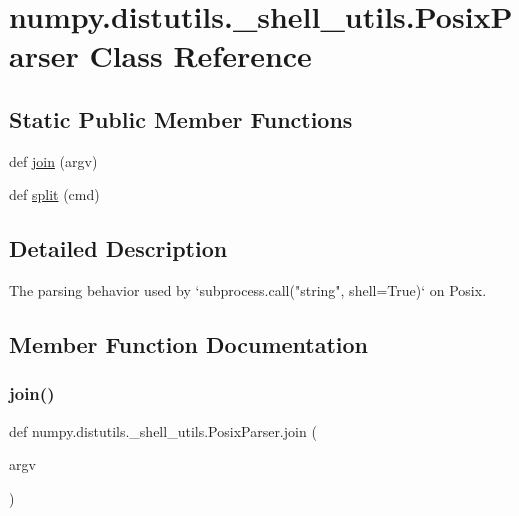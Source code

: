 \hypertarget{classnumpy_1_1distutils_1_1__shell__utils_1_1PosixParser}{}\section{numpy.\+distutils.\+\_\+shell\+\_\+utils.\+Posix\+Parser Class Reference}
\label{classnumpy_1_1distutils_1_1__shell__utils_1_1PosixParser}
\subsection*{Static Public Member Functions}
\begin{DoxyCompactItemize}
\item 
def \hyperlink{classnumpy_1_1distutils_1_1__shell__utils_1_1PosixParser_afa42ecaf5f9bfc1e0932c7f3404e1745}{join} (argv)
\item 
def \hyperlink{classnumpy_1_1distutils_1_1__shell__utils_1_1PosixParser_a1942c3cfa01e74aa2a84ed708b63da43}{split} (cmd)
\end{DoxyCompactItemize}


\subsection{Detailed Description}
\begin{DoxyVerb}The parsing behavior used by `subprocess.call("string", shell=True)` on Posix.
\end{DoxyVerb}
 

\subsection{Member Function Documentation}
\mbox{\label{classnumpy_1_1distutils_1_1__shell__utils_1_1PosixParser_afa42ecaf5f9bfc1e0932c7f3404e1745}} 
\subsubsection{\texorpdfstring{join()}{join()}}
{\footnotesize\ttfamily def numpy.\+distutils.\+\_\+shell\+\_\+utils.\+Posix\+Parser.\+join (\begin{DoxyParamCaption}\item[{}]{argv }\end{DoxyParamCaption})\hspace{0.3cm}{\ttfamily [static]}}

